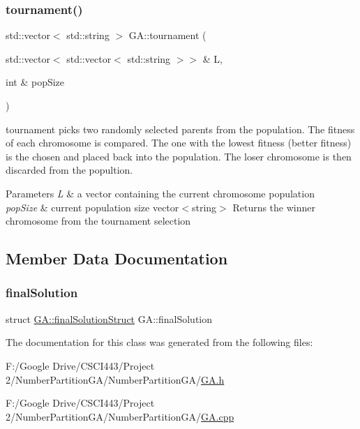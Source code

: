 \subsubsection{\texorpdfstring{tournament()}{tournament()}}
{\footnotesize\ttfamily std\+::vector$<$ std\+::string $>$ G\+A\+::tournament (\begin{DoxyParamCaption}\item[{std\+::vector$<$ std\+::vector$<$ std\+::string $>$$>$ \&}]{L,  }\item[{int \&}]{pop\+Size }\end{DoxyParamCaption})}



tournament picks two randomly selected parents from the population. The fitness of each chromosome is compared. The one with the lowest fitness (better fitness) is the chosen and placed back into the population. The loser chromosome is then discarded from the popultion. 


\begin{DoxyParams}{Parameters}
{\em L} & a vector containing the current chromosome population \\
\hline
{\em pop\+Size} & current population size  vector$<$string$>$ Returns the winner chromosome from the tournament selection \\
\hline
\end{DoxyParams}


\subsection{Member Data Documentation}
\hypertarget{class_g_a_a301e86430cdc9d3af98d85267fb0f963}{}\label{class_g_a_a301e86430cdc9d3af98d85267fb0f963} 
\subsubsection{\texorpdfstring{final\+Solution}{finalSolution}}
{\footnotesize\ttfamily struct \hyperlink{struct_g_a_1_1final_solution_struct}{G\+A\+::final\+Solution\+Struct}  G\+A\+::final\+Solution}



The documentation for this class was generated from the following files\+:\begin{DoxyCompactItemize}
\item 
F\+:/\+Google Drive/\+C\+S\+C\+I443/\+Project 2/\+Number\+Partition\+G\+A/\+Number\+Partition\+G\+A/\hyperlink{_g_a_8h}{G\+A.\+h}\item 
F\+:/\+Google Drive/\+C\+S\+C\+I443/\+Project 2/\+Number\+Partition\+G\+A/\+Number\+Partition\+G\+A/\hyperlink{_g_a_8cpp}{G\+A.\+cpp}\end{DoxyCompactItemize}
